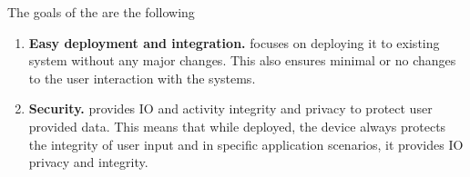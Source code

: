 The goals of the \name are the following

\begin{enumerate}
  \item \textbf{Easy deployment and integration.} \name focuses on deploying it to existing system without any major changes. This also ensures minimal or no changes to the user interaction with the systems.
  \item \textbf{Security.} \name provides IO and activity integrity and privacy to protect user provided data. This means that while deployed, the device always protects the integrity of user input and in specific application scenarios, it provides IO privacy and integrity.
\end{enumerate}



